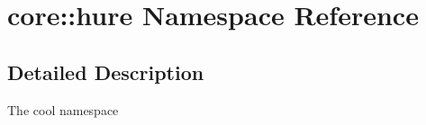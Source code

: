 \hypertarget{namespacecore_1_1hure}{}\section{core\+:\+:hure Namespace Reference}
\label{namespacecore_1_1hure}


\subsection{Detailed Description}
The cool namespace 